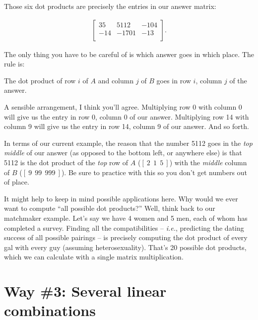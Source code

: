 \smallskip
Those six dot products are precisely the entries in our answer matrix:

\vspace{-.15in}
\begin{align*}
\begin{bmatrix}
35 & 5112 & -104 \\
-14 & -1701 & -13 \\
\end{bmatrix}.
\end{align*}
\vspace{-.15in}

The only thing you have to be careful of is which answer goes in which place.
The rule is:

\begin{framed}
The dot product of row $i$ of $A$ and column $j$ of $B$ goes in
row $i$, column $j$ of the answer.
\end{framed}

A sensible arrangement, I think you'll agree. Multiplying row 0 with column 0
will give us the entry in row 0, column 0 of our answer. Multiplying row 14
with column 9 will give us the entry in row 14, column 9 of our answer. And so
forth.

In terms of our current example, the reason that the number 5112 goes in the
\textit{top middle} of our answer (as opposed to the bottom left, or anywhere
else) is that 5112 is the dot product of the \textit{top} row of $A$ ($[\ 2\ \
1\ \ 5\ ]$) with the \textit{middle} column of $B$ ($[\ 9\ \ 99\ \ 999\ ]$).
Be sure to practice with this so you don't get numbers out of place.

\smallskip


It might help to keep in mind possible applications here. Why would we ever
want to compute ``all possible dot products?'' Well, think back to our
matchmaker example. Let's say we have 4 women and 5 men, each of whom has
completed a survey. Finding all the compatibilities -- \textit{i.e.},
predicting the dating success of all possible pairings -- is precisely
computing the dot product of every gal with every guy (assuming
heterosexuality). That's 20 possible dot products, which we can calculate with
a single matrix multiplication.


\section{Way \#3: Several linear combinations}

